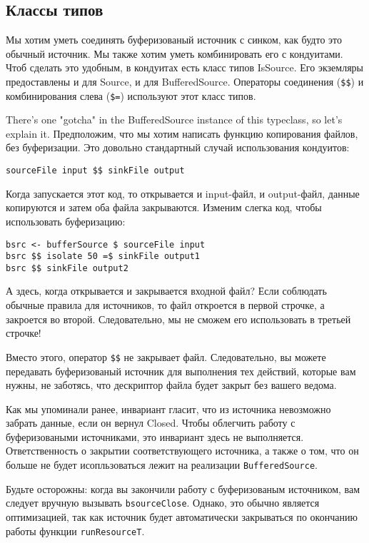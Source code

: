 \subsection{Классы типов}
Мы хотим уметь соединять буферизованый источник с синком, как будто это обычный источник.
Мы также хотим уметь комбинировать его с кондуитами. Чтоб сделать это удобным, в кондуитах
есть класс типов IsSource. Его экземляры предоставлены и для Source, и для BufferedSource. 
Операторы соединения (\verb#$$#) и комбинирования слева (\verb#$=#) используют этот класс типов.

There's one "gotcha" in the BufferedSource instance of this typeclass, so
let's explain it. Предположим, что мы хотим написать функцию копирования файлов, без буферизации. Это довольно стандартный случай использования кондуитов:
\begin{lstlisting}
sourceFile input $$ sinkFile output
\end{lstlisting}
Когда запускается этот код, то открывается и input-файл, и output-файл, данные 
копируются и затем оба файла закрываются. Изменим слегка код, чтобы 
использовать буферизацию:
\begin{lstlisting}
bsrc <- bufferSource $ sourceFile input
bsrc $$ isolate 50 =$ sinkFile output1
bsrc $$ sinkFile output2
\end{lstlisting}
А здесь, когда открывается и закрывается входной файл? Если соблюдать обычные 
правила для источников, то файл откроется в первой строчке, а закроется во 
второй. Следовательно, мы не сможем его использовать в третьей строчке!

Вместо этого, оператор \verb#$$# не закрывает файл. Следовательно, вы можете 
передавать буферизованый источник для выполнения тех действий, которые вам 
нужны, не заботясь, что дескриптор файла будет закрыт без вашего ведома.

Как мы упоминали ранее, инвариант гласит, что из источника невозможно забрать 
данные, если он вернул Closed. Чтобы облегчить работу с буферизоваными 
источниками, это инвариант здесь не выполняется. Ответственность о закрытии 
соответствующего источника, а также о том, что он больше не будет исопльзоваться
лежит на реализации \lstinline'BufferedSource'.

Будьте осторожны: когда вы закончили работу с буферизованым источником, вам 
следует вручную вызывать \lstinline'bsourceClose'. Однако, это обычно является 
оптимизацией, так как источник будет автоматически закрываться по окончанию 
работы функции \lstinline'runResourceT'.

